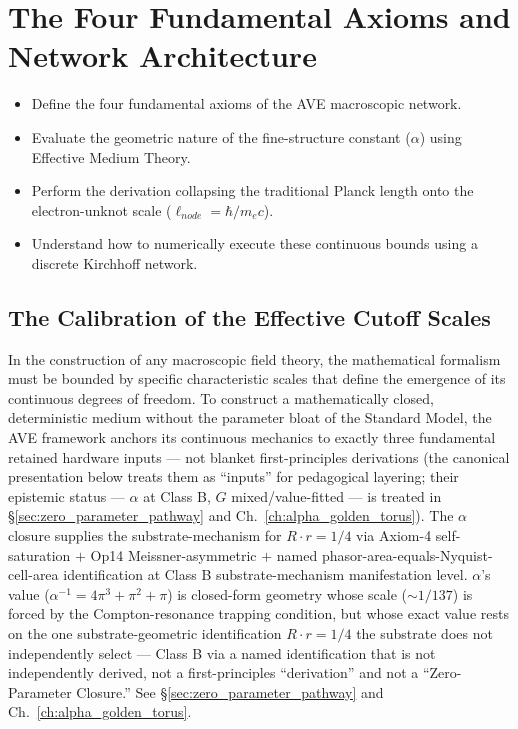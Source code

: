 \chapter{The Four Fundamental Axioms and Network Architecture}
\label{ch:fundamental_axioms}

\begin{objectivebox}
\begin{itemize}
    \item Define the four fundamental axioms of the AVE macroscopic network.
    \item Evaluate the geometric nature of the fine-structure constant ($\alpha$) using Effective Medium Theory.
    \item Perform the derivation collapsing the traditional Planck length onto the electron-unknot scale ($\ell_{node} = \hbar/m_e c$).
    \item Understand how to numerically execute these continuous bounds using a discrete Kirchhoff network.
\end{itemize}
\end{objectivebox}

\section{The Calibration of the Effective Cutoff Scales}
In the construction of any macroscopic field theory, the mathematical formalism must be bounded by specific characteristic scales that define the emergence of its continuous degrees of freedom. To construct a mathematically closed, deterministic medium without the parameter bloat of the Standard Model, the AVE framework anchors its continuous mechanics to exactly three fundamental retained hardware inputs --- not blanket first-principles derivations (the canonical presentation below treats them as ``inputs'' for pedagogical layering; their epistemic status --- $\alpha$ at Class B, $G$ mixed/value-fitted --- is treated in \S\ref{sec:zero_parameter_pathway} and Ch.~\ref{ch:alpha_golden_torus}). The $\alpha$ closure supplies the substrate-mechanism for $R \cdot r = 1/4$ via Axiom-4 self-saturation $+$ Op14 Meissner-asymmetric $+$ named phasor-area-equals-Nyquist-cell-area identification at Class B substrate-mechanism manifestation level. $\alpha$'s value ($\alpha^{-1} = 4\pi^3+\pi^2+\pi$) is closed-form geometry whose scale ($\sim 1/137$) is forced by the Compton-resonance trapping condition, but whose exact value rests on the one substrate-geometric identification $R \cdot r = 1/4$ the substrate does not independently select --- Class B via a named identification that is not independently derived, not a first-principles ``derivation'' and not a ``Zero-Parameter Closure.'' See \S\ref{sec:zero_parameter_pathway} and Ch.~\ref{ch:alpha_golden_torus}.

